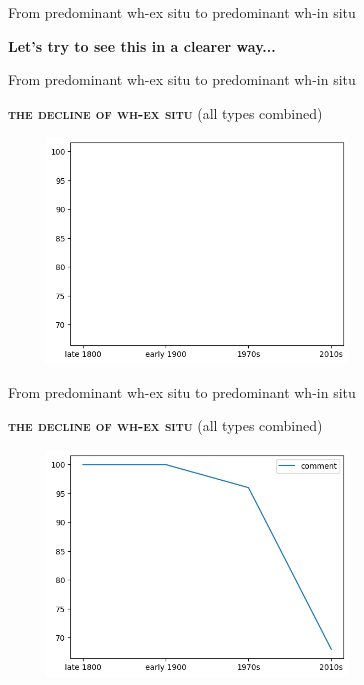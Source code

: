 \documentclass[lesson_slides]{subfiles}
\begin{document}
\begin{frame}[c]{From predominant wh-ex situ to predominant wh-in situ}

\begin{center}
    \textbf{Let's try to see this in a clearer way...}
\end{center}
  
\end{frame}
\begin{frame}[c]{From predominant wh-ex situ to predominant wh-in situ}

    \textbf{\textsc{the decline of wh-ex situ}} \pause (all types combined) \pause
    \begin{center}
        \includegraphics[width=10cm, height=6cm]{images/empty.png}
    \end{center}
  
\end{frame}
\begin{frame}[c]{From predominant wh-ex situ to predominant wh-in situ}

    \textbf{\textsc{the decline of wh-ex situ}} (all types combined)
    \begin{center}
        \includegraphics[width=10cm, height=6cm]{images/one.png}
    \end{center}
  
\end{frame}
\end{document}
